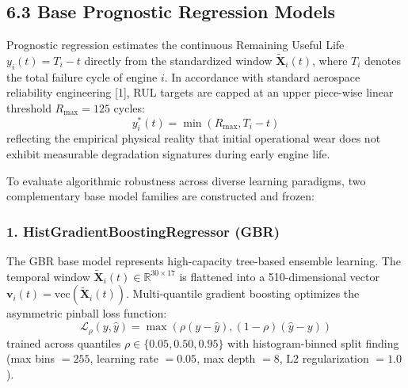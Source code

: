 \documentclass[12pt,a4paper]{article}
\begin{document}
\subsection*{6.3 Base Prognostic Regression Models}
Prognostic regression estimates the continuous Remaining Useful Life $y_i(t) = T_i - t$ directly from the standardized window $\tilde{\mathbf{X}}_i(t)$, where $T_i$ denotes the total failure cycle of engine $i$. In accordance with standard aerospace reliability engineering [1], RUL targets are capped at an upper piece-wise linear threshold $R_{\text{max}} = 125$ cycles:
\begin{equation}
y_i^*(t) = \min(R_{\text{max}}, T_i - t)
\end{equation}
reflecting the empirical physical reality that initial operational wear does not exhibit measurable degradation signatures during early engine life.

To evaluate algorithmic robustness across diverse learning paradigms, two complementary base model families are constructed and frozen:

\subsubsection*{1. HistGradientBoostingRegressor (GBR)}
The GBR base model represents high-capacity tree-based ensemble learning. The temporal window $\tilde{\mathbf{X}}_i(t) \in \mathbb{R}^{30 \times 17}$ is flattened into a 510-dimensional vector $\mathbf{v}_i(t) = \text{vec}(\tilde{\mathbf{X}}_i(t))$. Multi-quantile gradient boosting optimizes the asymmetric pinball loss function:
\begin{equation}
\mathcal{L}_{\rho}(y, \hat{y}) = \max(\rho(y - \hat{y}), (1 - \rho)(\hat{y} - y))
\end{equation}
trained across quantiles $\rho \in \{0.05, 0.50, 0.95\}$ with histogram-binned split finding (max bins $= 255$, learning rate $= 0.05$, max depth $= 8$, L2 regularization $= 1.0$).
\end{document}
